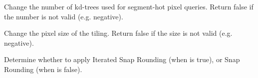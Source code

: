 {Change the number of kd-trees used for segment-hot pixel queries.
Return false if the number is not valid (e.g. negative). }

{Change the pixel size of the tiling.
Return false if the size is not valid (e.g. negative). }

{Determine whether to apply Iterated Snap Rounding (when  is true),
or Snap Rounding (when  is false).}




